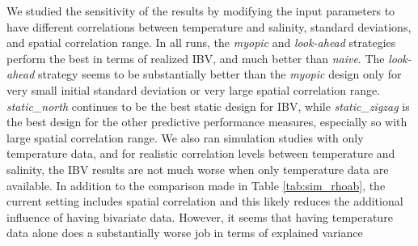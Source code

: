 \documentclass[aoas]{imsart}
\begin{document}
We studied the sensitivity of the results by modifying the input
parameters to have different correlations between temperature and
salinity, standard deviations, and spatial correlation range.  In all
runs, the \textit{myopic} and \textit{look-ahead} strategies perform
the best in terms of realized IBV, and much better than
\textit{naive}. The \textit{look-ahead} strategy seems to be
substantially better than the \textit{myopic} design only for very
small initial standard deviation or very large spatial correlation
range. \textit{static\_north} continues to be the best static design
for IBV, while \textit{static\_zigzag} is the best design for the
other predictive performance measures, especially so with large
spatial correlation range. We also ran simulation studies with only
temperature data, and for realistic correlation levels between
temperature and salinity, the IBV results are not much worse when only
temperature data are available. In addition to the comparison made in
Table \ref{tab:sim_rhoab}, the current setting includes spatial
correlation and this likely reduces the additional influence of having
bivariate data. However, it seems that having temperature data alone
does a substantially worse job in terms of explained variance
\end{document}
